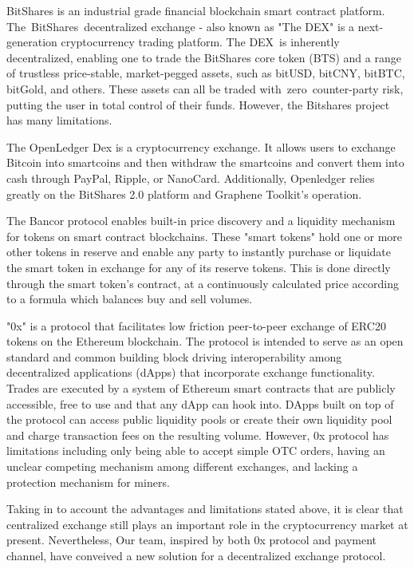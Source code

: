 \documentclass[UTF8,nofonts]{article}
\begin{document}
BitShares\cite{schuhbitshares}\cite{schuh2015bitshares} is an industrial grade financial blockchain smart contract platform. The BitShares decentralized exchange - also known as "The DEX" is a next-generation cryptocurrency trading platform. The DEX is inherently decentralized, enabling one to trade the BitShares core token (BTS) and a range of trustless price-stable, market-pegged assets, such as bitUSD, bitCNY, bitBTC, bitGold, and others. These assets can all be traded with zero counter-party risk, putting the user in total control of their funds. However, the Bitshares project has many limitations.

The OpenLedger Dex\cite{openledger} is a cryptocurrency exchange. It allows users to exchange Bitcoin into smartcoins and then withdraw the smartcoins and convert them into cash through PayPal, Ripple, or NanoCard. Additionally, Openledger relies greatly on the BitShares 2.0 platform and Graphene Toolkit's operation.

The Bancor\cite{bancor}\cite{hanson2012logarithmic} protocol enables built-in price discovery and a liquidity mechanism for tokens on smart contract blockchains. These "smart tokens" hold one or more other tokens in reserve and enable any party to instantly purchase or liquidate the smart token in exchange for any of its reserve tokens. This is done directly through the smart token's contract, at a continuously calculated price according to a formula which balances buy and sell volumes.

"0x"\cite{warren20170x} is a protocol that facilitates low friction peer-to-peer exchange of ERC20\cite{ERC20} tokens on the Ethereum blockchain. The protocol is intended to serve as an open standard and common building block driving interoperability among decentralized applications (dApps) that incorporate exchange functionality. Trades are executed by a system of Ethereum smart contracts that are publicly accessible, free to use and that any dApp can hook into. DApps built on top of the protocol can access public liquidity pools or create their own liquidity pool and charge transaction fees on the resulting volume. However, 0x protocol has limitations including  only being able to accept simple OTC orders, having an unclear competing mechanism among different exchanges, and lacking a protection mechanism for miners.

Taking in to account the advantages and limitations stated above, it is clear that centralized exchange still plays an important role in the cryptocurrency market at present. Nevertheless, Our team, inspired by both 0x protocol and payment channel, have conveived a new solution for a decentralized exchange protocol.
\end{document}
